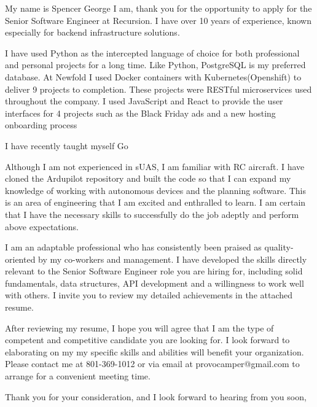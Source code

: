 \documentclass[11pt, a4paper]{awesome-cv}
\begin{document}
\makecvheader

\makelettertitle

\begin{cvletter}
My name is Spencer George I am, thank you for the opportunity to apply for the Senior Software Engineer at Recursion. I have over 10 years of experience, known especially for backend infrastructure solutions.

I have used Python as the intercepted language of choice for both professional and personal projects for a long time. Like Python, PostgreSQL is my preferred database. At Newfold I used Docker containers with Kubernetes(Openshift) to deliver 9 projects to completion. These projects were RESTful microservices used throughout the company. I used JavaScript and React to provide the user interfaces for 4 projects such as the Black Friday ads and a new hosting onboarding process

I have recently taught myself Go 

Although I am not experienced in sUAS, I am familiar with RC aircraft. I have cloned the Ardupilot repository and built the code so that I can expand my knowledge of working with autonomous devices and the planning software. This is an area of engineering that I am excited and enthralled to learn. I am certain that I have the necessary skills to successfully do the job adeptly and perform above expectations.

I am an adaptable professional who has consistently been praised as quality-oriented by my co-workers and management. I have developed the skills directly relevant to the Senior Software Engineer role you are hiring for, including solid fundamentals, data structures, API development and a willingness to work well with others. I invite you to review my detailed achievements in the attached resume.

After reviewing my resume, I hope you will agree that I am the type of competent and competitive candidate you are looking for. I look forward to elaborating on my my specific skills and abilities will benefit your organization. Please contact me at 801-369-1012 or via email at provocamper@gmail.com to arrange for a convenient meeting time.

Thank you for your consideration, and I look forward to hearing from you soon,

\end{cvletter}

\makeletterclosing
\end{document}
